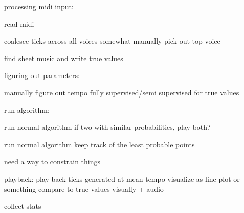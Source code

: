 processing midi input:

read midi

coalesce ticks across all voices
somewhat manually pick out top voice

find sheet music and write true values

figuring out parameters:

manually figure out tempo
fully supervised/semi supervised for true values

run algorithm:

run normal algorithm
if two with similar probabilities, play both?

run normal algorithm
keep track of the least probable points

need a way to constrain things

playback:
play back ticks generated at mean tempo
visualize as line plot or something
compare to true values visually + audio

collect stats